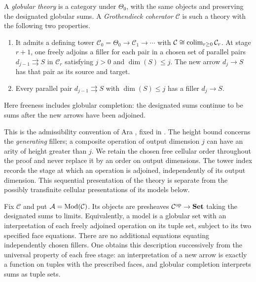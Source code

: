 \begin{definition}\label{def:coherator}
A \emph{globular theory} is a category under $\Theta_0$, with the same
objects and preserving the designated globular sums.  A
\emph{Grothendieck coherator} $\mathcal C$ is such a theory with the
following two properties.
\begin{enumerate}
\item It admits a defining tower
$\mathcal C_0=\Theta_0\to\mathcal C_1\to\cdots$ with
$\mathcal C\cong\operatorname*{colim}_{r\ge0}\mathcal C_r$.  At stage $r+1$, one
freely adjoins a filler for each pair in a chosen set of parallel pairs
$d_{j-1}\rightrightarrows S$ in $\mathcal C_r$ satisfying
$j>0$ and $\dim(S)\le j$.  The new arrow $d_j\to S$ has that pair
as its source and target.
\item Every parallel pair $d_{j-1}\rightrightarrows S$ with
$\dim(S)\le j$ has a filler $d_j\to S$.
\end{enumerate}
Here freeness includes globular completion: the designated sums continue
to be sums after the new arrows have been adjoined.
\end{definition}

This is the admissibility convention of Ara
\cite[Sections~2.3 and 2.9--2.11]{Ara2013}, fixed in
\cite[Section~5.3]{Henry2016}.  The height bound concerns the
\emph{generating} fillers; a composite operation of output dimension $j$
can have an arity of height greater than $j$.  We retain the chosen free
cellular order throughout the proof and never replace it by an order on
output dimensions.  The tower index records the stage at which an
operation is adjoined, independently of its output dimension.  This
sequential presentation of the theory is separate from the possibly
transfinite cellular presentations of its models below.

Fix $\mathcal C$ and put $\mathcal A=\operatorname{Mod}(\mathcal C)$.  Its objects are
presheaves $\mathcal C^{\mathrm{op}}\to\mathbf{Set}$ taking the designated sums
to limits.  Equivalently, a model is a globular set with an interpretation
of each freely adjoined operation on its tuple set, subject to its two
specified face equations.  There are no additional equations equating
independently chosen fillers.  One obtains this description successively
from the universal property of each free stage: an interpretation of a
new arrow is exactly a function on tuples with the prescribed faces, and
globular completion interprets sums as tuple sets.

